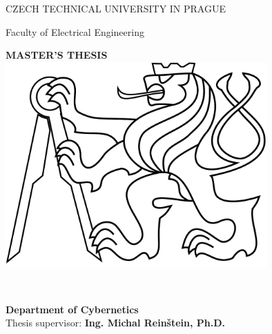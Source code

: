 \begin{titlepage}
\begin{center}

{\Large CZECH TECHNICAL UNIVERSITY IN PRAGUE}
\vskip 10pt

\vskip 8pt
{\Large Faculty of Electrical Engineering}
 
\vspace{50pt}
{\Huge\bf MASTER'S THESIS}\\
\vspace{40pt}
\includegraphics[width=10cm]{src/lev.pdf}

\vspace{40pt}
{\Large\rm \Author } \\
\vspace{20pt}
{\Large\bf \Title}

\vspace{60pt}
{\bf Department of Cybernetics}\\
\vspace{5pt}
{Thesis supervisor: {\bf Ing. Michal Reinštein, Ph.D.}}

\vspace{30pt}
\end{center}
\end{titlepage}
